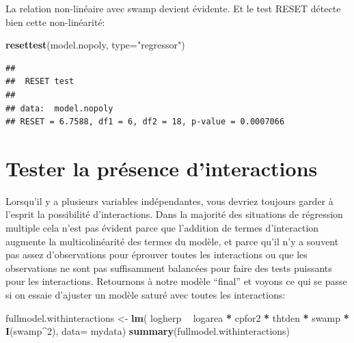 \documentclass[12pt,]{book}
\newenvironment{Shaded}{\begin{snugshade}}{\end{snugshade}}
\newcommand{\DataTypeTok}[1]{\textcolor[rgb]{0.13,0.29,0.53}{#1}}
\newcommand{\DecValTok}[1]{\textcolor[rgb]{0.00,0.00,0.81}{#1}}
\newcommand{\KeywordTok}[1]{\textcolor[rgb]{0.13,0.29,0.53}{\textbf{#1}}}
\newcommand{\NormalTok}[1]{#1}
\newcommand{\OperatorTok}[1]{\textcolor[rgb]{0.81,0.36,0.00}{\textbf{#1}}}
\newcommand{\StringTok}[1]{\textcolor[rgb]{0.31,0.60,0.02}{#1}}
\begin{document}
La relation non-linéaire avec swamp devient évidente. Et le test RESET détecte bien cette non-linéarité:

\begin{Shaded}
\begin{Highlighting}[]
\KeywordTok{resettest}\NormalTok{(model.nopoly, }\DataTypeTok{type=}\StringTok{"regressor"}\NormalTok{)}
\end{Highlighting}
\end{Shaded}

\begin{verbatim}
## 
##  RESET test
## 
## data:  model.nopoly
## RESET = 6.7588, df1 = 6, df2 = 18, p-value = 0.0007066
\end{verbatim}

\hypertarget{tester-la-pruxe9sence-dinteractions}{%
\section{Tester la présence d'interactions}\label{tester-la-pruxe9sence-dinteractions}}

Lorsqu'il y a plusieurs variables indépendantes, vous devriez toujours garder à l'esprit la possibilité d'interactions. Dans la majorité des situations de régression multiple cela n'est pas évident parce que l'addition de termes d'interaction augmente la multicolinéarité des termes du modèle, et parce qu'il n'y a souvent pas assez d'observations pour éprouver toutes les interactions ou que les observations ne sont pas suffisamment balancées pour faire des tests puissants pour les interactions. Retournons à notre modèle ``final'' et voyons ce qui se passe si on essaie d'ajuster un modèle saturé avec toutes les interactions:

\begin{Shaded}
\begin{Highlighting}[]
\NormalTok{fullmodel.withinteractions <-}\StringTok{ }\KeywordTok{lm}\NormalTok{(}
\NormalTok{  logherp }\OperatorTok{~}\StringTok{ }\NormalTok{logarea }\OperatorTok{*}\StringTok{ }\NormalTok{cpfor2 }\OperatorTok{*}\StringTok{ }\NormalTok{thtden }\OperatorTok{*}\StringTok{ }\NormalTok{swamp }\OperatorTok{*}\StringTok{ }\KeywordTok{I}\NormalTok{(swamp}\OperatorTok{^}\DecValTok{2}\NormalTok{),}
  \DataTypeTok{data=}\NormalTok{ mydata)}
\KeywordTok{summary}\NormalTok{(fullmodel.withinteractions)}
\end{Highlighting}
\end{Shaded}
\end{document}
